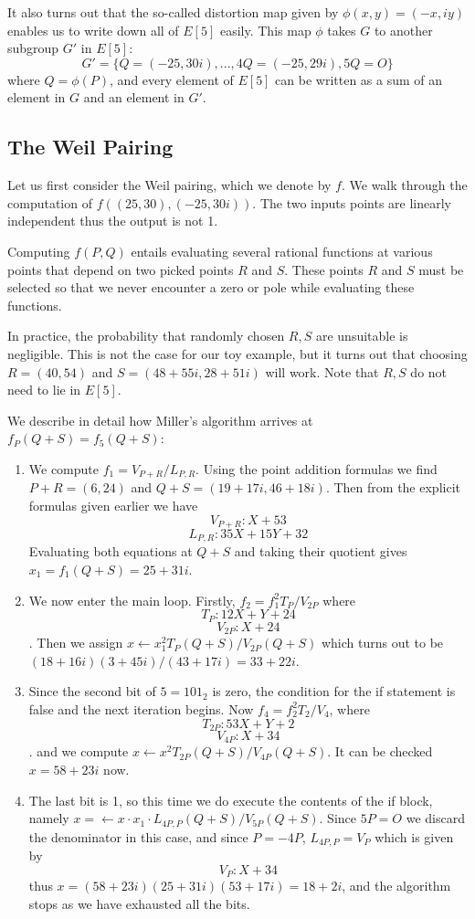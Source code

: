 It also turns out that the so-called distortion map given by
$\phi(x,y) = (-x, i y)$ enables us to write down all of $E[5]$ easily.
This map $\phi$ takes $G$ to another subgroup $G'$ in $E[5]$:
\[ G' =
\{Q = (-25, 30i), ..., 4Q = (-25, 29i), 5Q = O \} \]
where $Q = \phi(P)$,
and every element of $E[5]$ can be written as a sum of an element in $G$
and an element in $G'$.

\subsection {The Weil Pairing}

Let us first consider the Weil pairing, which we denote by $f$.
We walk through the computation of $f((25,30), (-25,30i))$.
The two inputs points are linearly independent thus the output is not 1.

Computing $f(P, Q)$ entails evaluating several rational functions
at various points that depend on two picked points $R$ and $S$.
These points $R$ and $S$ must be selected so that we never encounter a
zero or pole while evaluating these functions.

In practice, the probability that randomly chosen $R, S$ are unsuitable
is negligible. This is not the case for our toy example, but it turns
out that choosing $R = (40,54)$ and $S = (48+55i,28+51i)$
will work. Note that $R, S$ do not need to lie in $E[5]$.

We describe in detail how Miller's algorithm arrives at $f_P(Q+S) = f_5(Q+S)$:
\begin{enumerate}
\item
We compute $f_1 = V_{P+R} / L_{P,R}$.
Using the point addition formulas we find $P+R = (6,24)$
and $Q+S=(19+17i, 46+18i)$.
Then
from the explicit formulas given earlier we have
\[ V_{P+R} : X + 53 \]
\[ L_{P,R} : 35 X + 15 Y + 32 \]
Evaluating both equations at $Q + S$ and taking their quotient
gives $x_1 = f_1(Q+S) = 25 + 31i$.
\item
We now enter the main loop.
Firstly, $f_2 = f_1^2 T_{P} / V_{2P}$ where
\[ T_{P} : 12 X + Y + 24 \]
\[ V_{2P} : X + 24 \].
Then we assign $x \gets x_1^2 T_{P}(Q+S) / V_{2P}(Q+S)$
which turns out to be $(18 + 16i)(3+45i)/(43+17i) = 33 + 22i$.
\item
Since the second bit of $5 = 101_2$ is zero, the condition for the if statement
is false and the next iteration begins. Now
$f_4 = f_2^2 T_2 / V_4$, where
\[ T_{2P} : 53 X + Y + 2 \]
\[ V_{4P} : X + 34 \].
and we compute $x \gets x^2 T_{2P}(Q+S) / V_{4P}(Q+S)$.
It can be checked $x = 58 + 23i$ now.
\item
The last bit is 1, so this time we do execute the contents of the if block,
namely $x=\gets x \cdot x_1 \cdot L_{4P,P}(Q+S)/V_{5P}(Q+S)$.
Since $5P = O$ we discard the denominator in this case, and since $P = -4P$,
$L_{4P, P} = V_P$ which is given by
\[ V_P : X + 34 \] thus $x = (58+23i)(25+31i)(53+17i) = 18 + 2i$,
and the algorithm stops as we have exhausted all the bits.
\end{enumerate}

